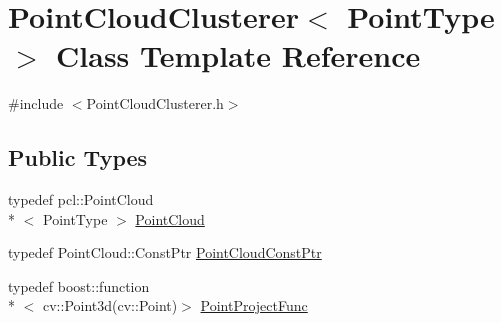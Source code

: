 \hypertarget{class_point_cloud_clusterer}{\section{Point\-Cloud\-Clusterer$<$ Point\-Type $>$ Class Template Reference}
\label{class_point_cloud_clusterer}
}


{\ttfamily \#include $<$Point\-Cloud\-Clusterer.\-h$>$}

\subsection*{Public Types}
\begin{DoxyCompactItemize}
\item 
typedef pcl\-::\-Point\-Cloud\\*
$<$ Point\-Type $>$ \hyperlink{class_point_cloud_clusterer_aeac82c7494ccf2580112ef55d7e30b39}{Point\-Cloud}
\item 
typedef Point\-Cloud\-::\-Const\-Ptr \hyperlink{class_point_cloud_clusterer_a042579611b15a7ae275603b624df3968}{Point\-Cloud\-Const\-Ptr}
\item 
typedef boost\-::function\\*
$<$ cv\-::\-Point3d(cv\-::\-Point)$>$ \hyperlink{class_point_cloud_clusterer_adc13c5f02a2a888f33eedbc33188f202}{Point\-Project\-Func}
\end{DoxyCompactItemize}
